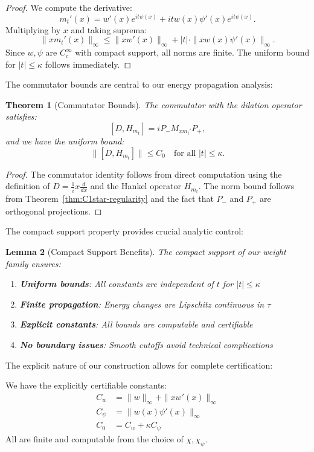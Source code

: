 \documentclass[11pt,hyp,]{nyjm}
\newtheorem{theorem}{Theorem}
\newtheorem{lemma}[theorem]{Lemma}
\begin{document}
\begin{proof}
We compute the derivative:
\[
m_t'(x) = w'(x)e^{it\psi(x)} + it w(x)\psi'(x)e^{it\psi(x)}.
\]
Multiplying by $x$ and taking suprema:
\[
\|x m_t'(x)\|_\infty \leq \|x w'(x)\|_\infty + |t| \cdot \|x w(x)\psi'(x)\|_\infty.
\]
Since $w, \psi$ are $C_c^\infty$ with compact support, all norms are finite. The uniform bound for $|t| \leq \kappa$ follows immediately.
\end{proof}

The commutator bounds are central to our energy propagation analysis:

\begin{theorem}[Commutator Bounds]\label{thm:commutator-bounds}
The commutator with the dilation operator satisfies:
\[
[D, H_{m_t}] = i P_- M_{x m_t'} P_+,
\]
and we have the uniform bound:
\[
\|[D, H_{m_t}]\| \leq C_0 \quad \text{for all } |t| \leq \kappa.
\]
\end{theorem}

\begin{proof}
The commutator identity follows from direct computation using the definition of $D = \tfrac{1}{i}x\frac{d}{dx}$ and the Hankel operator $H_{m_t}$. The norm bound follows from Theorem~\ref{thm:C1star-regularity} and the fact that $P_-$ and $P_+$ are orthogonal projections.
\end{proof}

The compact support property provides crucial analytic control:

\begin{lemma}[Compact Support Benefits]\label{lem:compact-support}
The compact support of our weight family ensures:
\begin{enumerate}
\item \textbf{Uniform bounds}: All constants are independent of $t$ for $|t| \leq \kappa$
\item \textbf{Finite propagation}: Energy changes are Lipschitz continuous in $\tau$
\item \textbf{Explicit constants}: All bounds are computable and certifiable
\item \textbf{No boundary issues}: Smooth cutoffs avoid technical complications
\end{enumerate}
\end{lemma}

The explicit nature of our construction allows for complete certification:

\begin{corollary}\label{cor:certified-constants}
We have the explicitly certifiable constants:
\begin{align*}
C_w &= \|w\|_\infty + \|x w'(x)\|_\infty \\
C_\psi &= \|w(x)\psi'(x)\|_\infty \\
C_0 &= C_w + \kappa C_\psi
\end{align*}
All are finite and computable from the choice of $\chi, \chi_\psi$.
\end{corollary}
\end{document}
